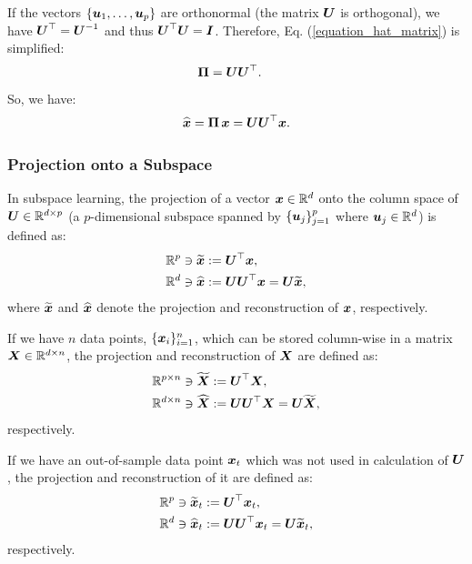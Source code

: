 \documentclass{article}
\def\b{\ensuremath\boldsymbol}
\begin{document}
If the vectors $\{\b{u}_1, \dots, \b{u}_p\}$ are orthonormal (the matrix $\b{U}$ is orthogonal), we have $\b{U}^\top = \b{U}^{-1}$ and thus $\b{U}^\top \b{U} = \b{I}$. Therefore, Eq. (\ref{equation_hat_matrix}) is simplified:
\begin{align}
& \b{\Pi} = \b{U} \b{U}^\top.
\end{align}
So, we have:
\begin{align}\label{equation_x_hat}
\widehat{\b{x}} = \b{\Pi}\, \b{x} = \b{U} \b{U}^\top \b{x}.
\end{align}

\subsubsection{Projection onto a Subspace}\label{section_projection_subspace}

In subspace learning, the projection of a vector $\b{x} \in \mathbb{R}^d$ onto the column space of $\b{U} \in \mathbb{R}^{d \times p}$ (a $p$-dimensional subspace spanned by $\{\b{u}_j\}_{j=1}^p$ where $\b{u}_j \in \mathbb{R}^d$) is defined as:
\begin{align}
&\mathbb{R}^{p} \ni \widetilde{\b{x}} := \b{U}^\top \b{x}, \label{equation_projection_training_onePoint_severalDirections} \\
&\mathbb{R}^{d} \ni \widehat{\b{x}} := \b{U}\b{U}^\top \b{x} = \b{U} \widetilde{\b{x}}, \label{equation_reconstruction_training_onePoint_severalDirections}
\end{align}
where $\widetilde{\b{x}}$ and $\widehat{\b{x}}$ denote the projection and reconstruction of $\b{x}$, respectively.

If we have $n$ data points, $\{\b{x}_i\}_{i=1}^n$, which can be stored column-wise in a matrix $\b{X} \in \mathbb{R}^{d \times n}$, the projection and reconstruction of $\b{X}$ are defined as:
\begin{align}
&\mathbb{R}^{p \times n} \ni \widetilde{\b{X}} := \b{U}^\top \b{X}, \label{equation_projection_training_SeveralPoints_severalDirections} \\
&\mathbb{R}^{d \times n} \ni \widehat{\b{X}} := \b{U}\b{U}^\top \b{X} = \b{U} \widetilde{\b{X}}, \label{equation_reconstruction_training_SeveralPoints_severalDirections}
\end{align}
respectively.

If we have an out-of-sample data point $\b{x}_t$ which was not used in calculation of $\b{U}$, the projection and reconstruction of it are defined as:
\begin{align}
&\mathbb{R}^{p} \ni \widetilde{\b{x}}_t := \b{U}^\top \b{x}_t, \label{equation_projection_outOfSample_onePoint_severalDirections} \\
&\mathbb{R}^{d} \ni \widehat{\b{x}}_t := \b{U}\b{U}^\top \b{x}_t = \b{U} \widetilde{\b{x}}_t, \label{equation_reconstruction_outOfSample_onePoint_severalDirections}
\end{align}
respectively.
\end{document}
